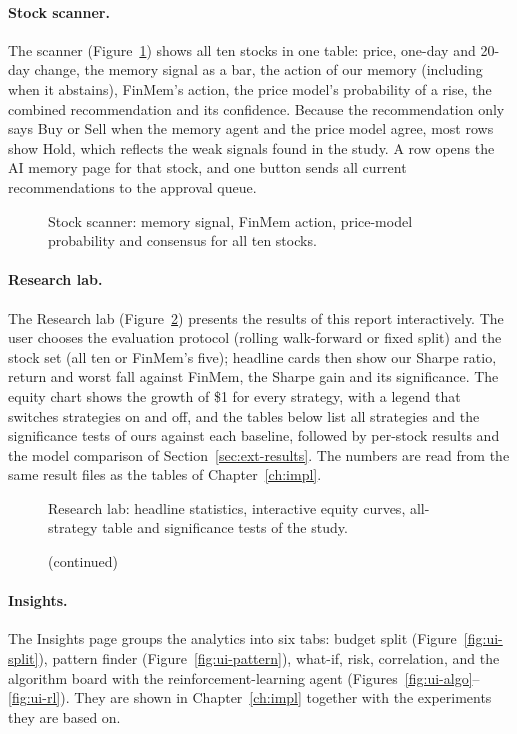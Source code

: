 \paragraph{Stock scanner.} The scanner (Figure~\ref{fig:ui-scanner}) shows all ten stocks in one table: price, one-day and 20-day change, the memory signal as a bar, the action of our memory (including when it abstains), FinMem's action, the price model's probability of a rise, the combined recommendation and its confidence. Because the recommendation only says Buy or Sell when the memory agent and the price model agree, most rows show Hold, which reflects the weak signals found in the study. A row opens the AI memory page for that stock, and one button sends all current recommendations to the approval queue.
\begin{figure}[!htbp]
\centering
{}
\caption{Stock scanner: memory signal, FinMem action, price-model probability and consensus for all ten stocks.}
\label{fig:ui-scanner}
\end{figure}

\paragraph{Research lab.} The Research lab (Figure~\ref{fig:ui-research}) presents the results of this report interactively. The user chooses the evaluation protocol (rolling walk-forward or fixed split) and the stock set (all ten or FinMem's five); headline cards then show our Sharpe ratio, return and worst fall against FinMem, the Sharpe gain and its significance. The equity chart shows the growth of \$1 for every strategy, with a legend that switches strategies on and off, and the tables below list all strategies and the significance tests of ours against each baseline, followed by per-stock results and the model comparison of Section~\ref{sec:ext-results}. The numbers are read from the same result files as the tables of Chapter~\ref{ch:impl}.
\begin{figure}[!htbp]
\centering
{}
\caption{Research lab: headline statistics, interactive equity curves, all-strategy table and significance tests of the study.}
\label{fig:ui-research}
\end{figure}
\begin{figure}[!htbp]
\ContinuedFloat
\centering
{}
\caption[]{(continued)}
\end{figure}

\paragraph{Insights.} The Insights page groups the analytics into six tabs: budget split (Figure~\ref{fig:ui-split}), pattern finder (Figure~\ref{fig:ui-pattern}), what-if, risk, correlation, and the algorithm board with the reinforcement-learning agent (Figures~\ref{fig:ui-algo}--\ref{fig:ui-rl}). They are shown in Chapter~\ref{ch:impl} together with the experiments they are based on.

